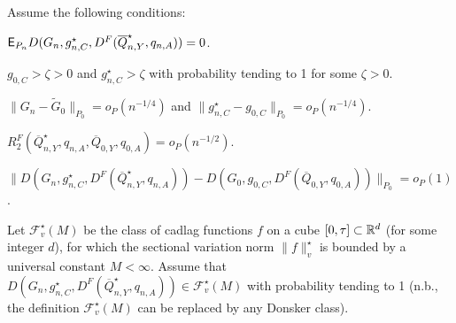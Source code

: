 Assume the following conditions:
\begin{assumption}\label{ass:eif_rootn}
  $\mathsf{E}_{P_n} D(G_n, g^{\star}_{n,C}, D^F(\overline{Q}^{\star}_{n,Y},
    q_{n,A})) = 0$.
\end{assumption}
\begin{assumption}\label{ass:sampling_bound}
  $g_{0,C} > \zeta > 0$ and $g^{\star}_{n,C} > \zeta$ with probability tending
  to 1 for some $\zeta > 0$.
\end{assumption}
\begin{assumption}\label{ass:obs_eif_parametric}
    $\lVert G_n - \widetilde{G}_0 \rVert_{P_0} = o_P(n^{-1/4})$ and
        $\lVert g^{\star}_{n,C} - g_{0,C} \rVert_{P_0} = o_P(n^{-1/4})$.
\end{assumption}
\begin{assumption}\label{ass:r2_fulldata}
  $R_2^F(\overline{Q}^{\star}_{n,Y}, q_{n,A}, \overline{Q}_{0,Y},
       q_{0,A}) = o_P(n^{-1/2})$.
\end{assumption}
\begin{assumption}\label{ass:neglig_obs_eif}
   $\lVert D(G_n, g^{\star}_{n,C}, D^F(\overline{Q}^{\star}_{n,Y},
        q_{n,A})) - D(G_0, g_{0,C}, D^{F}(\overline{Q}_{0,Y}, q_{0,A}))
        \rVert_{P_0} = o_P(1)$.
\end{assumption}
\begin{assumption}\label{ass:donsker}
   Let $\mathcal{F}_v^{\star}(M)$ be the class of cadlag functions $f$
   on a cube $[0,\tau] \subset \mathbb{R}^d$ (for some integer $d$), for which the
   sectional variation norm $\lVert f \rVert_v^{\star}$ is bounded by a
   universal constant $M < \infty$. Assume that $D(G_n,
   g^{\star}_{n,C}, D^{F}(\overline{Q}^{\star}_{n,Y}, q_{n,A})) \in
   \mathcal{F}_v^{\star}(M)$ with probability tending to 1 (n.b., the
   definition $\mathcal{F}_v^{\star}(M)$ can be replaced by any Donsker class).
\end{assumption}

